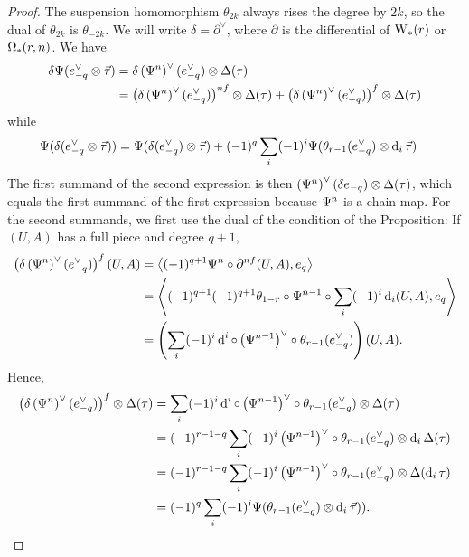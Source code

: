 \begin{proof}
The suspension homomorphism $\theta_{2k}$ always rises the degree by $2k$, so the dual of $\theta_{2k}$ is $\theta_{-2k}$. We will write $\delta = \partial^\vee$, where $\partial$ is the differential of $\operatorname{W}_{*}(r)$ or $\operatorname{\Omega}_{*}(r,n)$. We have
\begin{align*}
	\delta \Psi(e_{-q}^\vee \otimes \vec{\tau})
		&= \delta \left(\Psi^n\right)^{\vee}(e_{-q}^\vee) \otimes \Delta(\tau)\\
		&= \left(\delta\left(\Psi^n\right)^{\vee}(e_{-q}^\vee)\right)^{nf} \otimes \Delta(\tau) + \left(\delta\left(\Psi^n\right)^{\vee}(e_{-q}^\vee)\right)^{f} \otimes \Delta(\tau)
\end{align*}
while
\begin{align*}
	\Psi(\delta(e_{-q}^\vee \otimes \vec{\tau}))
		&=\Psi(\delta(e_{-q}^\vee) \otimes \vec{\tau}) + (-1)^{q} \sum_i (-1)^{i} \Psi(\theta_{r-1}(e_{-q}^\vee) \otimes \operatorname{d}_i \vec{\tau})
	\end{align*}
The first summand of the second expression is then $\left(\Psi^n\right)^\vee(\delta e_{-q}) \otimes \Delta(\tau)$, which equals the first summand of the first expression because $\Psi^{n}$ is a chain map. For the second summands, we first use the dual of the condition of the Proposition: If $(U,A)$ has a full piece and degree $q+1$,
\begin{align*}
	\left(\delta\left(\Psi^n\right)^\vee (e_{-q}^\vee)\right)^{f}(U,A)
	&= \left\langle (-1)^{q+1}\Psi^n\circ \partial^{nf}(U,A),e_{q}\right\rangle
	\\
	&= \left\langle (-1)^{q+1}(-1)^{q+1}\theta_{1-r}\circ \Psi^{n-1}\circ \sum_i (-1)^i \operatorname{d}_i(U,A),e_q\right\rangle
	\\
	&= \left(\sum_i (-1)^i\operatorname{d}^i\circ \left(\Psi^{n-1}\right)^{\vee}\circ \theta_{r-1}(e_{-q}^\vee)\right)(U,A).
\end{align*}
Hence,
\begin{align*}
	\left(\delta\left(\Psi^n\right)^{\vee}(e_{-q}^\vee)\right)^{f} \otimes \Delta(\tau)
		&= \sum_i (-1)^i \operatorname{d}^i\circ \left(\Psi^{n-1}\right)^\vee\circ \theta_{r-1} (e_{-q}^\vee) \otimes \Delta(\tau)
		\\
		&=(-1)^{r-1-q}\sum_i (-1)^i\left(\Psi^{n-1}\right)^\vee \circ \theta_{r-1} (e_{-q}^\vee) \otimes \operatorname{d}_i\Delta(\tau)
		\\
		&= (-1)^{r-1-q}\sum_i (-1)^i\left(\Psi^{n-1}\right)^\vee \circ \theta_{r-1} (e_{-q}^\vee) \otimes \Delta(\operatorname{d}_i\tau)
		\\
	&= (-1)^q\sum_i (-1)^{i} \Psi(\theta_{r-1}(e_{-q}^\vee) \otimes \operatorname{d}_i \vec{\tau})).\qedhere
\end{align*}
\end{proof}

